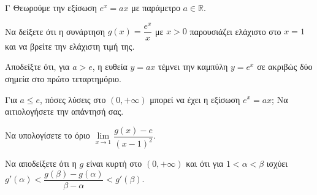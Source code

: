 \begin{thema}{Γ}
Θεωρούμε την εξίσωση $e^x = a x$ με παράμετρο $a \in \mathbb{R}$.
\begin{erwthma}
  \item Να δείξετε ότι η συνάρτηση $g(x) = \dfrac{e^x}{x}$ με $x>0$ παρουσιάζει ελάχιστο στο $x=1$ και να βρείτε την ελάχιστη τιμή της.
  \item Αποδείξτε ότι, για $a > e$, η ευθεία $y = a x$ τέμνει την καμπύλη $y = e^x$ σε ακριβώς δύο σημεία στο πρώτο τεταρτημόριο. 
  \item Για $a \le e$, πόσες λύσεις στο $(0, +\infty)$ μπορεί να έχει η εξίσωση $e^x = a x$; Να αιτιολογήσετε την απάντησή σας.
  \item Να υπολογίσετε το όριο $\lim\limits_{x \to 1} \dfrac{g(x) - e}{(x-1)^2}$.
  \item Να αποδείξετε ότι η $g$ είναι κυρτή στο $(0, +\infty)$ και ότι για $1 < \alpha < \beta$ ισχύει $g'(\alpha) < \dfrac{g(\beta) - g(\alpha)}{\beta - \alpha} < g'(\beta)$.
\end{erwthma}
\end{thema}
